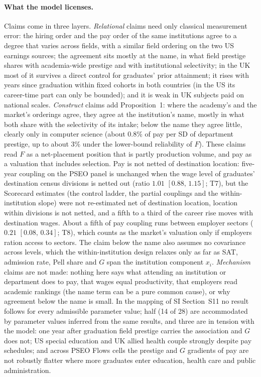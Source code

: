 \documentclass[11pt]{article}
\newcommand{\SI}[1]{SI Section~S#1}
\newcommand{\SItheory}{\SI{11}}
\newcommand{\ci}[2]{$[#1,\allowbreak\,#2]$}
\begin{document}
\paragraph{What the model licenses.} Claims come in three layers. \emph{Relational} claims need only classical
measurement error: the hiring order and the pay order of the same institutions agree to a degree that varies across
fields, with a similar field ordering on the two US earnings sources; the agreement sits mostly at the name, in
what field prestige shares with academia-wide prestige and with institutional selectivity; in the UK most of it
survives a direct control for graduates' prior attainment; it rises with years since graduation within fixed
cohorts in both countries (in the US its career-time part can only be bounded); and it is weak in UK subjects paid
on national scales. \emph{Construct} claims add Proposition~1: where the academy's and the market's orderings
agree, they agree at the institution's name, mostly in what both share with the selectivity of its intake; below
the name they agree little, clearly only in computer science (about 0.8\% of pay per SD of department prestige, up
to about 3\% under the lower-bound reliability of $F$). These claims read $F$ as a net-placement position that is
partly production volume, and pay as a valuation that includes selection. Pay is not netted of destination
location: five-year coupling on the PSEO panel is unchanged when the wage level of graduates' destination census
divisions is netted out (ratio $1.01$ \ci{0.88}{1.15}; T7), but the Scorecard estimates (the control ladder, the
partial couplings and the within-institution slope) were not re-estimated net of destination location, location
within divisions is not netted, and a fifth to a third of the career rise moves with destination wages. About a
fifth of pay coupling runs between employer sectors ($0.21$ \ci{0.08}{0.34}; T8), which counts as the market's
valuation only if employers ration access to sectors. The claim below the name also assumes no covariance across
levels, which the within-institution design relaxes only as far as SAT, admission rate, Pell share and $G$ span the
institution component $x_i$. \emph{Mechanism} claims are not made: nothing here says what attending an institution
or department does to pay, that wages equal productivity, that employers read academic rankings (the name term can
be a pure common cause), or why agreement below the name is small. In the mapping of \SItheory{} no result follows
for every admissible parameter value; half (14 of 28) are accommodated by parameter values inferred from the same
results, and three are in tension with the model: one year after graduation field prestige carries the
association and $G$ does not; US special education and UK allied health couple strongly despite pay schedules; and
across PSEO Flows cells the prestige and $G$ gradients of pay are not robustly flatter where more graduates enter
education, health care and public administration.
\end{document}
